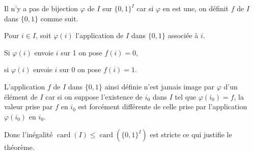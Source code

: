 Il n'y a pas de bijection $\varphi$ de $I$ sur $\{0,1\}^I$ car si $\varphi$ en est une, on définit $f$ de $I$ dans $\{0,1\}$ comme suit.

Pour $i\in I$, soit $\varphi(i)$ l'application de $I$ dans $\{0,1\}$ associée à $i$.

Si $\varphi(i)$ envoie $i$ sur 1 on pose $f(i)=0$,

si $\varphi(i)$ envoie $i$ sur 0 on pose $f(i)=1$.

L'application $f$ de $I$ dans $\{0,1\}$ ainsi définie n'est jamais image par $\varphi$ d'un élément de $I$ car si on suppose l'existence de $i_0$ dans $I$ tel que $\varphi(i_0)=f$, la valeur prise par $f$ en $i_0$ est forcément différente de celle prise par l'application $\varphi(i_0)$ en $i_0$.

Donc l'inégalité $\operatorname{card}(I)\le\operatorname{card}(\{0,1\}^I)$ est stricte ce qui justifie le théorème. \bookend
